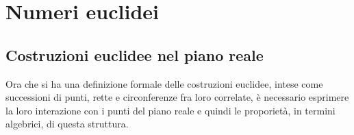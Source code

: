 
\chapter{Numeri euclidei}

\section{Costruzioni euclidee nel piano reale}
Ora che si ha una definizione formale delle costruzioni euclidee, intese come successioni di punti, rette e circonferenze fra loro correlate, è necessario esprimere la loro interazione con i punti del piano reale e quindi le proporietà, in termini algebrici, di questa struttura.

